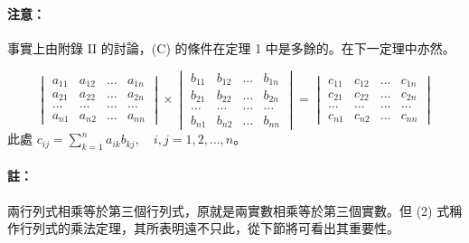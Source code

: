 \paragraph{注意：}事實上由附錄 II 的討論，(C) 的條件在定理 1 中是多餘的。在下一定理中亦然。

\begin{theorem}[行列式的乘法定理]\label{thm:b6s-1-13}
\begin{equation}
\begin{vmatrix}
a_{11} & a_{12} & \dots & a_{1n} \\
a_{21} & a_{22} & \dots & a_{2n} \\
\dots & \dots & \dots & \dots \\
a_{n1} & a_{n2} & \dots & a_{nn}
\end{vmatrix} \times \begin{vmatrix}
b_{11} & b_{12} & \dots & b_{1n} \\
b_{21} & b_{22} & \dots & b_{2n} \\
\dots & \dots & \dots & \dots \\
b_{n1} & b_{n2} & \dots & b_{nn}
\end{vmatrix} = \begin{vmatrix}
c_{11} & c_{12} & \dots & c_{1n} \\
c_{21} & c_{22} & \dots & c_{2n} \\
\dots & \dots & \dots & \dots \\
c_{n1} & c_{n2} & \dots & c_{nn}
\end{vmatrix} \label{eq:b6s-1-6-2}
\end{equation}
此處 $c_{ij} = \sum_{k=1}^n a_{ik} b_{kj}, \quad i, j = 1, 2, \dots, n$。
\end{theorem}

\paragraph{註：}兩行列式相乘等於第三個行列式，原就是兩實數相乘等於第三個實數。但 (2) 式稱作行列式的乘法定理，其所表明遠不只此，從下節將可看出其重要性。

